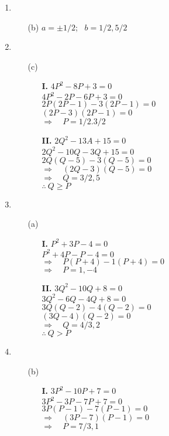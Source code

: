 \begin{multicols}{2}
\begin{enumerate}
\item
  \begin{itemize}
\item[(b)] $a = \pm 1/2$;~ $b = 1/2, 5/2$
  \end{itemize}
\item
  \begin{itemize}
  \item[(c)]
    \begin{itemize}
    \item[{\bf I.}] $4P^2 - 8P + 3 = 0$\\
      $4P^2 - 2P - 6P + 3 = 0$\\
      $2P(2P - 1)-3 (2P - 1) = 0$\\
      $(2P - 3)(2P - 1) = 0$\\
      $\Rightarrow\quad P = 1/2. 3/2$

    \item[{\bf II.}] $2Q^2 - 13A + 15 = 0$\\
      $2Q^2 - 10Q - 3Q + 15 = 0$\\
      $2Q(Q - 5) -3(Q - 5) = 0$\\
      $\Rightarrow\quad (2Q - 3)(Q - 5) = 0$\\
      $\Rightarrow\quad Q = 3/2, 5$\\
      $\therefore\ Q \geq P$
      \end{itemize}
  \end{itemize}
\item
  \begin{itemize}
  \item[(a)]
    \begin{itemize}
    \item[{\bf I.}] $P^2 + 3P - 4 = 0$\\
      $P^2 + 4P - P - 4 = 0$\\
      $\Rightarrow\quad P(P + 4) -1(P + 4) = 0$\\
      $\Rightarrow\quad P = 1, -4$\\

    \item[{\bf II.}] $3Q^2 - 10Q + 8 = 0$\\
      $3Q^2 - 6Q - 4Q + 8 = 0$\\
      $3Q(Q - 2) -4(Q - 2) = 0$\\
      $(3Q - 4)(Q - 2) = 0$\\
      $\Rightarrow\quad Q = 4/3, 2$\\
      $\therefore~ Q > P$
      \end{itemize}
  \end{itemize}
\item
  \begin{itemize}
  \item[(b)]
    \begin{itemize}
    \item[{\bf I.}] $3P^2 - 10P + 7 = 0$\\
      $3P^2 - 3P - 7P + 7 = 0$\\
      $3P(P - 1) -7(P - 1) = 0$\\
      $\Rightarrow\quad (3P - 7)(P - 1) = 0$\\
      $\Rightarrow\quad P = 7/3, 1$


\end{itemize}
\end{itemize}
\end{enumerate}
\end{multicols}

